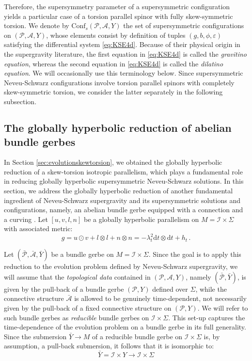 \documentclass[10pt,reqno,a4paper]{amsart}
\theoremstyle{plain}
\theoremstyle{definition}
\theoremstyle{remark}
\theoremstyle{remark}
\def\dd{\mathrm{d}}
\def\Conf{\mathrm{Conf}}
\def\cA{\mathcal{A}}
\def\cI{\mathcal{I}}
\def\cP{\mathcal{P}}
\renewcommand{\(}{ (}
\renewcommand{\)}{ )}
\begin{document}
\noindent
Therefore, the supersymmetry parameter of a supersymmetric configuration yields a particular case of a torsion parallel spinor with fully skew-symmetric torsion. We denote by $\Conf_s(\cP, \cA, Y)$ the set of supersymmetric configurations on $(\cP, \cA, Y)$, whose elements consist by definition of tuples $(g,b,\phi,\varepsilon)$ satisfying the differential system \eqref{eq:KSE4d}. Because of their physical origin in the supergravity literature, the first equation in \eqref{eq:KSE4d} is called the \emph{gravitino equation}, whereas the second equation in \eqref{eq:KSE4d} is called the \emph{dilatino equation}. We will occasionally use this terminology below. Since supersymmetric Neveu-Schwarz configurations involve torsion parallel spinors with completely skew-symmetric torsion, we consider the latter separately in the following subsection.  



%

\subsection{The globally hyperbolic reduction of abelian bundle gerbes}
\label{sec:reductionbundlegerbe}

%

In Section \ref{sec:evolutionskewtorsion}, we obtained the globally hyperbolic reduction of a skew-torsion isotropic parallelism, which plays a fundamental role in reducing globally hyperbolic supersymmetric Neveu-Schwarz solutions. In this section, we address the globally hyperbolic reduction of another fundamental ingredient of Neveu-Schwarz supergravity and its supersymmetric solutions and configurations, namely, an abelian bundle gerbe equipped with a connection and a curving \cite{Murray}. Let $[u,v,l,n]$ be a globally hyperbolic parallelism on $M = \cI \times \Sigma$ with associated metric:
\begin{equation*}
g = u \odot v + l\otimes l + n\otimes n = -\lambda^2_t \dd t\otimes \dd t + h_t\, .
\end{equation*} 

\noindent
Let $(\bar{\cP} , \bar{\cA}, \bar{Y})$ be a bundle gerbe on $M = \cI\times \Sigma$. Since the goal is to apply this reduction to the evolution problem defined by Neveu-Schwarz supergravity, we will assume that the \emph{topological data} contained in $(\cP, \cA, Y)$, namely $(\bar{\cP},\bar{Y})$, is given by the pull-back of a bundle gerbe $(\cP,Y)$ defined over $\Sigma$, while the connective structure $\bar{\cA}$ is allowed to be genuinely time-dependent, not necessarily given by the pull-back of a fixed connective structure on $(\cP,Y)$. We will refer to such bundle gerbes as \emph{reducible} bundle gerbes on $\cI\times \Sigma$. This set-up captures the time-dependence of the evolution problem on a bundle gerbe in its full generality. Since the submersion $\bar{Y} \to M$ of a reducible bundle gerbe on $\cI\times\Sigma$ is, by assumption, a pull-back submersion, it follows that it is isomorphic to:
\begin{equation*}
\bar{Y} = \cI \times Y \to \cI \times \Sigma	
\end{equation*}
\end{document}
